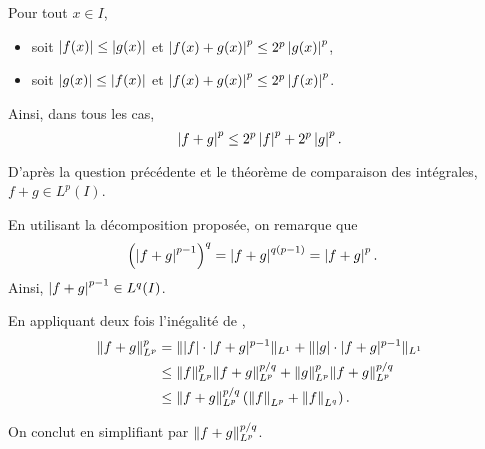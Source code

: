 \begin{solution}
\begin{reponses}
\item Pour tout $x \in I$,
\begin{itemize}
\item soit $\left| f(x) \right| \leq \left| g(x) \right|$ et $\left| f(x) + g(x) \right|^p \leq 2^p \left| g(x) \right|^p$,
\item soit $\left| g(x) \right| \leq \left| f(x) \right|$ et $\left| f(x) + g(x) \right|^p \leq 2^p \left| f(x) \right|^p$.
\end{itemize}
Ainsi, dans tous les cas,
\[
\left| f + g \right|^p \leq 2^p \left| f \right|^p + 2^p \left| g \right|^p.
\]

\item D'après la question précédente et le théorème de comparaison des intégrales, $f + g \in L^p(I)$.

\item En utilisant la décomposition proposée, on remarque que
\begin{align*}
\left(\left| f + g \right|^{p-1}\right)^q
&= \left| f + g \right|^{q(p-1)}
= \left| f + g \right|^p.
\end{align*}
Ainsi, $\left| f + g \right|^{p-1} \in L^q(I)$.

En appliquant deux fois l'inégalité de ,
\begin{align*}
\Vert f + g \Vert_{L^p}^p
&= \Vert |f| \cdot |f + g|^{p-1} \Vert_{L^1}
+ \Vert |g| \cdot |f + g|^{p-1} \Vert_{L^1}\\
&\leq \norm{f}_{L^p}^p \norm{f + g}_{L^p}^{p/q}
+ \norm{g}_{L^p}^p \norm{f + g}_{L^p}^{p/q}\\
&\leq \norm{f + g}_{L^p}^{p/q} \left(\norm{f}_{L^p} + \norm{f}_{L^q}\right).
\end{align*}

On conclut en simplifiant par $\norm{f + g}_{L^p}^{p/q}$.
\end{reponses}
\end{solution}


